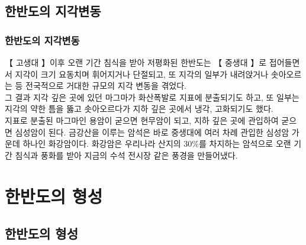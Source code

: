 \documentclass[12pt,a4paper]{book}
\newcommand{\SectionMargin}			{\newpage  \null \vskip 0cm}
\begin{document}
\newpage
\chapter{한반도의 지각변동}

					\minitoc				%
		


	\SectionMargin
	\section{한반도의 지각변동}

		【 고생대 】이후 오랜 기간 침식을 받아 저평화된 한반도는 
		【 중생대 】로 접어들면서 지각이 크기 요동치며 휘어지거나 단절되고, 
		또 지각의 일부가 내려앉거나 솟아오르는 등 전국적으로 거대한 규모의 지각 변동을 겪었다. \\

		그 결과 지각 깊은 곳에 있던 마그마가 화산폭발로 지표에 분출되기도 하고, 
		또 일부는 지각의 약한 틈을 뚫고 솟아오르다가 지하 깊은 곳에서 냉각, 고화되기도 했다. \\

		지표로 분출된 마그마인 용암이 굳으면 현무암이 되고, 
		지하 깊은 곳에 관입하여 굳으면 심성암이 된다. 
		금강산을 이루는 암석은 바로 중생대에 여러 차례 관입한 심성암 가운데 하나인 화강암이다. 
		화강암은 우리나라 산지의 30\%를 차지하는 암석으로 
		오랜 기간 침식과 풍화를 받아 지금의 수석 전시장 같은 풍경을 만들어냈다.
	
	



		\part{한반도의 형성}


\newpage
\chapter{한반도의 형성}

					\minitoc				%
		
\end{document}
